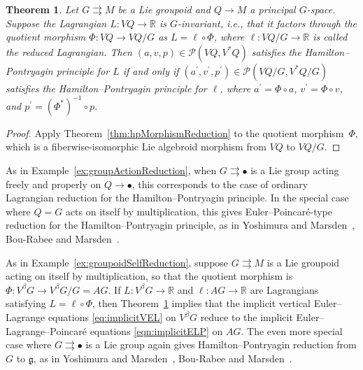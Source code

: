 \documentclass[pdftex]{sigma}
\numberwithin{equation}{section}
\newtheorem{Theorem}{Theorem}[section]
\begin{document}
\begin{Theorem} \label{thm:hpGroupoidReduction}
 Let $ G \rightrightarrows M $ be a Lie groupoid and $ Q \rightarrow M $ a principal $G$-space. Suppose the Lagrangian $ L \colon V Q \rightarrow \mathbb{R} $ is $G$-invariant, i.e., that it factors through the quotient morphism $ \Phi \colon V Q \rightarrow V Q / G $ as $ L = \ell \circ \Phi $, where $ \ell \colon V Q / G \rightarrow \mathbb{R} $ is called the reduced Lagrangian. Then $ ( a, v, p ) \in \mathcal{P} ( V Q , V ^\ast Q ) $ satisfies the Hamilton--Pontryagin principle for $L$ if and only if $ ( a ^\prime , v ^\prime , p ^\prime ) \in \mathcal{P} ( V Q / G, V ^\ast Q / G ) $ satisfies the Hamilton--Pontryagin principle for $ \ell $, where $ a ^\prime = \Phi \circ a $, $ v ^\prime = \Phi \circ v $, and $ p ^\prime = (\Phi ^\ast) ^{-1} \circ p $.
\end{Theorem}

\begin{proof} Apply Theorem~\ref{thm:hpMorphismReduction} to the quotient morphism~$\Phi$, which is a f\/iberwise-isomorphic Lie algebroid morphism from $ V Q $ to $ V Q / G $.
\end{proof}

\begin{Example}As in Example~\ref{ex:groupActionReduction}, when $ G \rightrightarrows \bullet $ is a Lie group acting freely and properly on $ Q \rightarrow \bullet $, this corresponds to the case of ordinary Lagrangian reduction for the Hamilton--Pontryagin principle. In the special case where $ Q = G $ acts on itself by multiplication, this gives Euler--Poincar\'e-type reduction for the Hamilton--Pontryagin principle, as in Yoshimura and Marsden~\cite{YoMa2007}, Bou-Rabee and Marsden~\cite{BoMa2009}.
\end{Example}

\begin{Example}As in Example~\ref{ex:groupoidSelfReduction}, suppose $ G \rightrightarrows M $ is a Lie groupoid acting on itself by multiplication, so that the quotient morphism is $ \Phi \colon V ^\beta G \rightarrow V ^\beta G / G = A G $. If $ L \colon V ^\beta G \rightarrow \mathbb{R} $ and $ \ell \colon A G \rightarrow \mathbb{R} $ are Lagrangians satisfying $ L = \ell \circ \Phi $, then Theorem~\ref{thm:hpGroupoidReduction} implies that the implicit vertical Euler--Lagrange equations \eqref{eq:implicitVEL} on $ V ^\beta G $ reduce to the implicit Euler--Lagrange--Poincar\'e equations \eqref{eqn:implicitELP} on $ A G $. The even more special case where $ G \rightrightarrows \bullet $ is a Lie group again gives Hamilton--Pontryagin reduction from $G$ to $ \mathfrak{g} $, as in Yoshimura and Marsden~\cite{YoMa2007}, Bou-Rabee and Marsden~\cite{BoMa2009}.
\end{Example}
\end{document}
